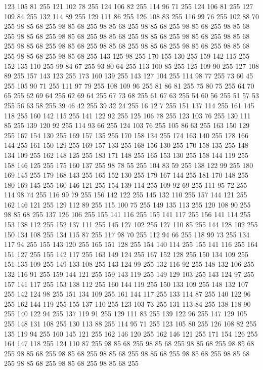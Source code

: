 123 105 81 255 121 102 78 255 124 106 82 255 114 96 71 255 124 106 81 255 127 109 84 255 132 114 89 255 129 111 86 255 126 108 83 255 116 99 76 255 102 88 70 255 98 85 68 255 98 85 68 255 98 85 68 255 98 85 68 255 98 85 68 255 98 85 68 255 98 85 68 255 98 85 68 255 98 85 68 255 98 85 68 255 98 85 68 255 98 85 68 255 98 85 68 255 98 85 68 255 98 85 68 255 98 85 68 255 98 85 68 255 98 85 68 255 98 85 68 255 98 85 68 255 143 125 98 255 170 155 130 255 159 142 115 255 152 135 110 255 99 84 67 255 93 80 64 255 113 100 85 255 125 109 90 255 127 108 89 255 157 143 123 255 173 160 139 255 143 127 104 255 114 98 77 255 73 60 45 255 105 90 71 255 111 97 79 255 108 109 96 255 81 86 81 255 75 80 75 255 64 70 65 255 62 69 64 255 62 69 64 255 67 73 68 255 61 67 63 255 54 60 56 255 51 57 53 255 56 63 58 255 39 46 42 255 39 32 24 255 16 12 7 255 151 137 114 255 161 145 118 255 160 142 115 255
141 122 92 255 125 106 78 255 123 103 76 255 130 111 85 255 139 120 92 255 114 93 66 255 124 103 76 255 105 86 63 255 163 150 129 255 167 154 130 255 169 157 135 255 170 158 134 255 174 163 140 255 178 166 144 255 161 150 129 255 169 157 133 255 168 156 130 255 170 158 135 255 148 134 109 255 162 148 125 255 183 171 148 255 165 153 130 255 158 144 119 255 158 146 125 255 175 160 137 255 98 78 55 255 104 83 59 255 138 122 99 255 180 169 145 255 179 168 143 255 165 152 130 255 179 167 144 255 181 170 148 255 180 169 145 255 160 146 121 255 154 139 114 255 109 92 69 255 111 95 72 255 114 98 74 255 116 99 79 255 156 142 122 255 145 132 110 255 157 144 121 255 162 146 121 255 129 112 89 255 115 100 75 255 149 135 113 255 120 108 90 255 98 85 68 255 137 126 106 255 155 141 116 255 155 141 117 255 156 141 114 255 153 138 112 255 152 137 111 255 145 127 102 255 127 110 85 255 144 128 102 255 150 134 108 255 134 115 87 255 117 98 70 255 112 94 66 255 118 99 73 255 134 117 94 255
155 143 120 255 165 151 128 255 154 140 114 255 155 141 116 255 164 151 127 255 155 142 117 255 163 149 124 255 167 152 128 255 150 134 109 255 151 135 109 255 149 133 108 255 143 124 99 255 132 116 92 255 148 132 106 255 132 116 91 255 159 144 121 255 159 143 119 255 149 129 103 255 143 124 97 255 157 141 117 255 153 138 112 255 160 144 119 255 150 133 109 255 148 132 107 255 142 124 98 255 151 134 109 255 161 144 117 255 133 114 87 255 140 122 96 255 162 144 119 255 155 137 110 255 123 103 73 255 131 113 84 255 138 118 90 255 140 122 94 255 137 119 91 255 129 111 83 255 139 122 96 255 147 129 105 255 148 131 108 255 130 113 88 255 114 95 71 255 123 105 80 255 126 108 82 255 135 119 94 255 160 145 121 255 162 146 120 255 162 146 121 255 171 154 126 255 164 147 118 255 124 110 87 255 98 85 68 255 98 85 68 255 98 85 68 255 98 85 68 255 98 85 68 255 98 85 68 255 98 85 68 255 98 85 68 255 98 85 68 255 98 85 68 255 98 85 68 255 98 85 68 255 98 85 68 255
